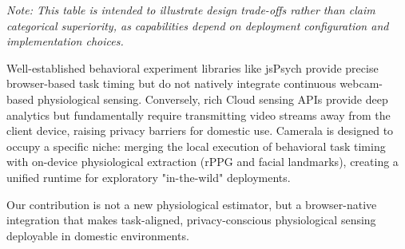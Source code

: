 \documentclass[dvipdfmx]{ehis}
\begin{document}
\begin{table}[t]
    \begin{center}
    \caption{Design Trade-off Mapping of Data Collection Platforms}
\label{tab:related_work}
\vspace{1mm}
\footnotesize{\textit{Note: This table is intended to illustrate design trade-offs rather than claim categorical superiority, as capabilities depend on deployment configuration and implementation choices.}}
\end{center}
\end{table}

Well-established behavioral experiment libraries like jsPsych provide precise browser-based task timing but do not natively integrate continuous webcam-based physiological sensing. Conversely, rich Cloud sensing APIs provide deep analytics but fundamentally require transmitting video streams away from the client device, raising privacy barriers for domestic use. Camerala is designed to occupy a specific niche: merging the local execution of behavioral task timing with on-device physiological extraction (rPPG and facial landmarks), creating a unified runtime for exploratory "in-the-wild" deployments.

Our contribution is not a new physiological estimator, but a browser-native integration that makes task-aligned, privacy-conscious physiological sensing deployable in domestic environments.
\end{document}
